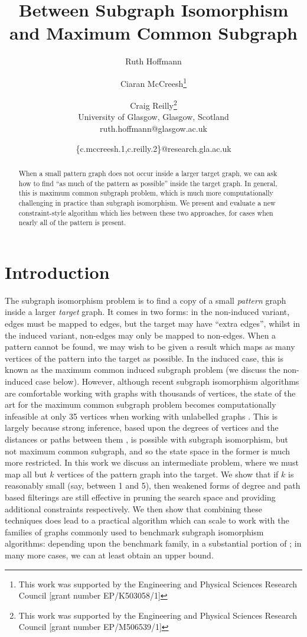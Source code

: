\documentclass[letterpaper]{article}
\title{Between Subgraph Isomorphism and Maximum Common Subgraph}
\author{Ruth Hoffmann \and Ciaran McCreesh\thanks{This work was supported by the Engineering and Physical Sciences
Research Council [grant number EP/K503058/1]} \and Craig Reilly\thanks{This work was supported by the Engineering and Physical Sciences Research Council [grant number EP/M506539/1]} \\
University of Glasgow, Glasgow, Scotland \\
ruth.hoffmann@glasgow.ac.uk \and \{c.mccreesh.1,c.reilly.2\}@research.gla.ac.uk}
\newcommand{\citep}[1]{\cite{#1}}
\theoremstyle{definition}
\begin{document}
\maketitle

\begin{abstract}
    When a small pattern graph does not occur inside a larger target graph, we can ask how to find
    ``as much of the pattern as possible'' inside the target graph. In general, this is maximum
    common subgraph problem, which is much more computationally challenging in practice than
    subgraph isomorphism. We present and evaluate a new constraint-style algorithm which lies
    between these two approaches, for cases when nearly all of the pattern is present.
\end{abstract}

\section{Introduction}

The subgraph isomorphism problem is to find a copy of a small \emph{pattern} graph inside a larger
\emph{target} graph. It comes in two forms: in the non-induced variant, edges must be mapped to
edges, but the target may have ``extra edges'', whilst in the induced variant, non-edges may only be
mapped to non-edges. When a pattern cannot be found, we may wish to be given a result which maps as
many vertices of the pattern into the target as possible. In the induced case, this is known as the
maximum common induced subgraph problem (we discuss the non-induced case below). However, although
recent subgraph isomorphism algorithms are comfortable working with graphs with thousands of
vertices, the state of the art for the maximum common subgraph problem becomes computationally
infeasible at only 35 vertices when working with unlabelled graphs \citep{DBLP:conf/cp/McCreeshNPS16}. This is
largely because strong inference, based upon the degrees of vertices
\citep{DBLP:journals/ai/Solnon10} and the distances or paths between them
\citep{DBLP:conf/cp/AudemardLMGP14,DBLP:conf/cp/McCreeshP15}, is possible with subgraph isomorphism,
but not maximum common subgraph, and so the state space in the former is much more restricted. In
this work we discuss an intermediate problem, where we must map all but $k$ vertices of the pattern
graph into the target. We show that if $k$ is reasonably small (say, between 1 and 5), then weakened
forms of degree and path based filterings are still effective in pruning the search space and
providing additional constraints respectively. We then show that combining these techniques does
lead to a practical algorithm which can scale to work with the families of graphs commonly used to
benchmark subgraph isomorphism algorithms: depending upon the benchmark family, in a substantial
portion of ; in many more cases, we can at least obtain an upper bound.
\end{document}
